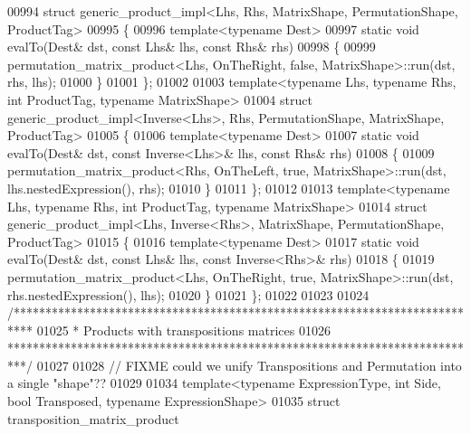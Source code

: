 \begin{DoxyCode}
00994 \textcolor{keyword}{struct }generic\_product\_impl<Lhs, Rhs, MatrixShape, PermutationShape, ProductTag>
00995 \{
00996   \textcolor{keyword}{template}<\textcolor{keyword}{typename} Dest>
00997   \textcolor{keyword}{static} \textcolor{keywordtype}{void} evalTo(Dest& dst, \textcolor{keyword}{const} Lhs& lhs, \textcolor{keyword}{const} Rhs& rhs)
00998   \{
00999     permutation\_matrix\_product<Lhs, OnTheRight, false, MatrixShape>::run(dst, rhs, lhs);
01000   \}
01001 \};
01002 
01003 \textcolor{keyword}{template}<\textcolor{keyword}{typename} Lhs, \textcolor{keyword}{typename} Rhs, \textcolor{keywordtype}{int} ProductTag, \textcolor{keyword}{typename} MatrixShape>
01004 \textcolor{keyword}{struct }generic\_product\_impl<Inverse<Lhs>, Rhs, PermutationShape, MatrixShape, ProductTag>
01005 \{
01006   \textcolor{keyword}{template}<\textcolor{keyword}{typename} Dest>
01007   \textcolor{keyword}{static} \textcolor{keywordtype}{void} evalTo(Dest& dst, \textcolor{keyword}{const} Inverse<Lhs>& lhs, \textcolor{keyword}{const} Rhs& rhs)
01008   \{
01009     permutation\_matrix\_product<Rhs, OnTheLeft, true, MatrixShape>::run(dst, lhs.nestedExpression(), rhs);
01010   \}
01011 \};
01012 
01013 \textcolor{keyword}{template}<\textcolor{keyword}{typename} Lhs, \textcolor{keyword}{typename} Rhs, \textcolor{keywordtype}{int} ProductTag, \textcolor{keyword}{typename} MatrixShape>
01014 \textcolor{keyword}{struct }generic\_product\_impl<Lhs, Inverse<Rhs>, MatrixShape, PermutationShape, ProductTag>
01015 \{
01016   \textcolor{keyword}{template}<\textcolor{keyword}{typename} Dest>
01017   \textcolor{keyword}{static} \textcolor{keywordtype}{void} evalTo(Dest& dst, \textcolor{keyword}{const} Lhs& lhs, \textcolor{keyword}{const} Inverse<Rhs>& rhs)
01018   \{
01019     permutation\_matrix\_product<Lhs, OnTheRight, true, MatrixShape>::run(dst, rhs.nestedExpression(), lhs);
01020   \}
01021 \};
01022 
01023 
01024 \textcolor{comment}{/***************************************************************************}
01025 \textcolor{comment}{* Products with transpositions matrices}
01026 \textcolor{comment}{***************************************************************************/}
01027 
01028 \textcolor{comment}{// FIXME could we unify Transpositions and Permutation into a single "shape"??}
01029 
01034 \textcolor{keyword}{template}<\textcolor{keyword}{typename} ExpressionType, \textcolor{keywordtype}{int} S\textcolor{keywordtype}{id}e, \textcolor{keywordtype}{bool} Transposed, \textcolor{keyword}{typename} ExpressionShape>
01035 \textcolor{keyword}{struct }transposition\_matrix\_product

\end{DoxyCode}
